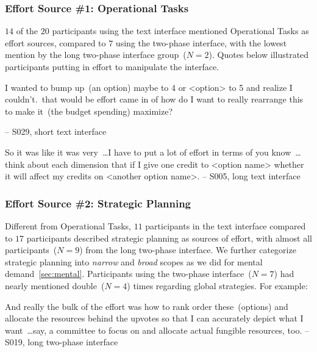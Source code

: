 \subsubsection{Effort Source \#1: Operational Tasks} $14$ of the $20$ participants using the text interface mentioned Operational Tasks as effort sources, compared to $7$ using the two-phase interface, with the lowest mention by the long two-phase interface group~($N=2$). Quotes below illustrated participants putting in effort to manipulate the interface.
\begin{displayquote}
I wanted to bump up~(an option) maybe to 4 or <option> to 5 and realize I couldn't.~\bracketellipsis that would be effort came in of how do I want to really rearrange this to make it~(the budget spending) maximize?

\noindent \hfill -- S029, short text interface
\end{displayquote}
\begin{displayquote}
So it was like it was very~\ldots I have to put a lot of effort in terms of you know~\ldots think about each dimension that if I give one credit to <option name> whether it will affect my credits on <another option name>. \noindent\hfill -- S005, long text interface
\end{displayquote}

\subsubsection{Effort Source \#2: Strategic Planning} Different from Operational Tasks, $11$ participants in the text interface compared to $17$ participants described strategic planning as sources of effort, with almost all participants~($N=9$) from the long two-phase interface. We further categorize strategic planning into \textit{narrow} and \textit{broad} scopes as we did for mental demand~\cref{sec:mental}. Participants using the two-phase interface~($N=7$) had nearly mentioned double~($N=4$) times regarding global strategies. For example:

\begin{displayquote}
And really the bulk of the effort was how to rank order these~(options) and allocate the resources behind the upvotes so that I can accurately depict what I want~\ldots say, a committee to focus on and allocate actual fungible resources, too. \noindent \hfill -- S019, long two-phase interface
\end{displayquote}


